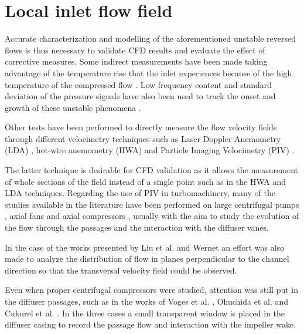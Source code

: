 \section{Local inlet flow field}
\label{sec:liter_local_flow}

Accurate characterization and modelling of the aforementioned unstable reversed flows is thus necessary to validate CFD results and evaluate the effect of corrective measures. Some indirect measurements have been made taking advantage of the temperature rise that the inlet experiences because of the high temperature of the compressed flow \cite{andersen2009surge,figurella2012noise}. Low frequency content and standard deviation of the pressure signals have also been used to track the onset and growth of these unstable phenomena \cite{liu2013methods}.

Other tests have been performed to directly measure the flow velocity fields through different velocimetry techniques such as Laser Doppler Anemometry (LDA) \cite{pedersen2003flow}, hot-wire anemometry (HWA) \cite{oro2009forced,kalpakli2015combined} and Particle Imaging Velocimetry (PIV) \cite{wernet2000development,liu2006application,pedersen2003flow}.

The latter technique is desirable for CFD validation as it allows the measurement of whole sections of the field instead of a single point such as in the HWA and LDA techniques. Regarding the use of PIV in turbomachinery, many of the studies available in the literature have been performed on large centrifugal pumps \cite{pedersen2003flow,dazin2011high,wu2011piv}, axial fans \cite{fike2014visualisation,oro2009forced} and axial compressors \cite{liu2006application,wernet2000development,wernet2000application,wernet2001investigation}, usually with the aim to study the evolution of the flow through the passages and the interaction with the diffuser vanes. 

In the case of the works presented by Liu et al. \cite{liu2006application} and Wernet \cite{wernet2000development,wernet2000application} an effort was also made to analyze the distribution of flow in planes perpendicular to the channel direction so that the transversal velocity field could be observed.

Even when proper centrifugal compressors were studied, attention was still put in the diffuser passages, such as in the works of Voges et al. \cite{voges2007application}, Ohuchida et al. \cite{ohuchida2013internal} and Cukurel et al. \cite{cukurel2010particle}. In the three cases a small transparent window is placed in the diffuser casing to record the passage flow and interaction with the impeller wake.

